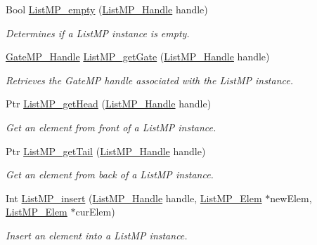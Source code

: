 \begin{DoxyCompactItemize}
Bool \hyperlink{_list_m_p_8h_a87f3489e92331dd7e3a2ca7315d6ae88}{ListMP\_\-empty} (\hyperlink{_list_m_p_8h_abf5a0381ce9dab133382015abaf7fe6b}{ListMP\_\-Handle} handle)
\begin{DoxyCompactList}\small\item\em Determines if a ListMP instance is empty. \item\end{DoxyCompactList}\item 
\hyperlink{_gate_m_p_8h_ad5bb259f928a14e98d973334bc60ebb3}{GateMP\_\-Handle} \hyperlink{_list_m_p_8h_abcbcfa3aa97f94f1559c94e3de56a445}{ListMP\_\-getGate} (\hyperlink{_list_m_p_8h_abf5a0381ce9dab133382015abaf7fe6b}{ListMP\_\-Handle} handle)
\begin{DoxyCompactList}\small\item\em Retrieves the GateMP handle associated with the ListMP instance. \item\end{DoxyCompactList}\item 
Ptr \hyperlink{_list_m_p_8h_a3f94c683617f51b4e9de75d87c729524}{ListMP\_\-getHead} (\hyperlink{_list_m_p_8h_abf5a0381ce9dab133382015abaf7fe6b}{ListMP\_\-Handle} handle)
\begin{DoxyCompactList}\small\item\em Get an element from front of a ListMP instance. \item\end{DoxyCompactList}\item 
Ptr \hyperlink{_list_m_p_8h_a75ac818a89cae66a10fb200f691c3949}{ListMP\_\-getTail} (\hyperlink{_list_m_p_8h_abf5a0381ce9dab133382015abaf7fe6b}{ListMP\_\-Handle} handle)
\begin{DoxyCompactList}\small\item\em Get an element from back of a ListMP instance. \item\end{DoxyCompactList}\item 
Int \hyperlink{_list_m_p_8h_a202b294a05f5be8b909c38e592978e8b}{ListMP\_\-insert} (\hyperlink{_list_m_p_8h_abf5a0381ce9dab133382015abaf7fe6b}{ListMP\_\-Handle} handle, \hyperlink{struct_list_m_p___elem}{ListMP\_\-Elem} $\ast$newElem, \hyperlink{struct_list_m_p___elem}{ListMP\_\-Elem} $\ast$curElem)
\begin{DoxyCompactList}\small\item\em Insert an element into a ListMP instance. \item\end{DoxyCompactList}\item 

\end{DoxyCompactItemize}
